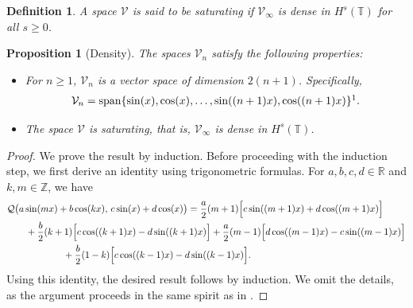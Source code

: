 \documentclass[10pt, reqno]{amsart}
\newtheorem{proposition}{Proposition} [section]
\newtheorem{definition}{Definition}
\numberwithin{equation}{section}
\begin{document}
\begin{definition}\label{saturating}
	A space \(\mathcal{V}\) is said to be saturating if \(\mathcal{V}_{\infty}\) is dense in \(H^s(\mathbb{T})\) for all \(s \geq 0\).
\end{definition}


\begin{proposition}[Density]\label{prp_saturating}
The spaces \(\mathcal{V}_n\) satisfy the following properties:
\begin{itemize}
\item[(i)] For \(n \geq 1\), \(\mathcal{V}_n\) is a vector space of dimension \(2(n + 1) \). Specifically, 
\begin{align}\label{space_V_n}
\mathcal{V}_n = \mathrm{span}\{ \sin(x), \cos(x), \dots, \sin((n + 1) x), \cos((n + 1) x)\}\footnotemark.
\end{align}
\item[(ii)] The space \(\mathcal{V}\) is saturating, that is, \(\mathcal{V}_{\infty}\) is dense in \(H^s(\mathbb{T})\).
\end{itemize}
\end{proposition}
\begin{proof}
We prove the result by induction. Before proceeding with the induction step, we first derive an identity using trigonometric formulas. For $a,b,c,d \in \mathbb{R}$ and $k,m \in \mathbb{Z}$, we have
\begin{align}
&\mathcal{Q}\big(a \sin(mx) + b \cos(kx),\, c \sin(x) + d \cos(x)\big) = \frac{a}{2} (m + 1) \Big[ c \sin((m + 1)x) + d \cos((m + 1)x)\Big]  \notag \\
& \qquad + \frac{b}{2} (k + 1) \Big[ c \cos((k + 1)x) - d \sin((k + 1)x)\Big]  + \frac{a}{2} (m - 1) \Big[ d \cos((m - 1)x) - c \sin((m - 1)x)\Big] \notag \\
&\qquad \qquad \qquad+ \frac{b}{2} (1 - k) \Big[ c \cos((k - 1)x) - d \sin((k - 1)x)\Big].
\end{align}
Using this identity, the desired result follows by induction. We omit the details, as the argument proceeds in the same spirit as in \cite{Chowdhury_Dutta_Mondal_25}.
\end{proof}
\end{document}
